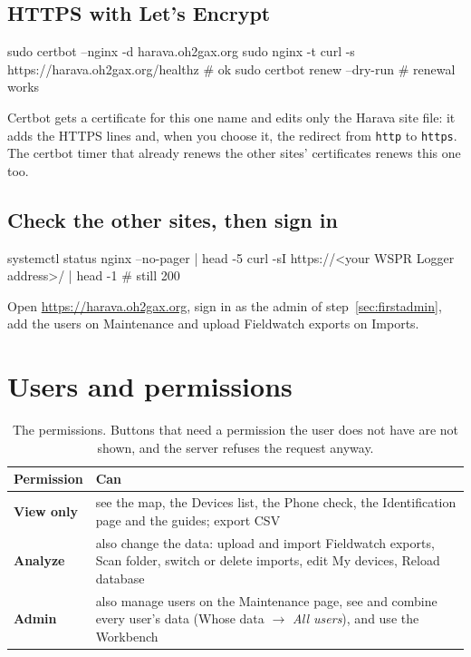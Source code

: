 \documentclass[10pt,a4paper]{article}
\newcommand{\ui}[1]{\textsf{\small #1}}
\begin{document}
\subsection{HTTPS with Let's Encrypt}
\begin{cmd}
sudo certbot --nginx -d harava.oh2gax.org
sudo nginx -t
curl -s https://harava.oh2gax.org/healthz    # ok
sudo certbot renew --dry-run                 # renewal works
\end{cmd}
Certbot gets a certificate for this one name and edits only the Harava site file: it adds the HTTPS lines and, when you choose it, the redirect from \texttt{http} to \texttt{https}. The certbot timer that already renews the other sites' certificates renews this one too.

\subsection{Check the other sites, then sign in}
\begin{cmd}
systemctl status nginx --no-pager | head -5
curl -sI https://<your WSPR Logger address>/ | head -1   # still 200
\end{cmd}
Open \url{https://harava.oh2gax.org}, sign in as the admin of step~\ref{sec:firstadmin}, add the users on \ui{Maintenance} and upload Fieldwatch exports on \ui{Imports}.

\section{Users and permissions}\label{sec:users}

\begin{table}[H]\small\centering
\caption{The permissions. Buttons that need a permission the user does not have are not shown, and the server refuses the request anyway.}
\begin{tabularx}{\textwidth}{>{\bfseries}p{2.2cm}X}
\toprule
Permission & Can\\
\midrule
View only & see the map, the Devices list, the Phone check, the Identification page and the guides; export CSV\\
Analyze & also change the data: upload and import Fieldwatch exports, \ui{Scan folder}, switch or delete imports, edit My devices, \ui{Reload database}\\
Admin & also manage users on the Maintenance page, see and combine every user's data (\ui{Whose data} $\rightarrow$ \emph{All users}), and use the Workbench\\
\bottomrule
\end{tabularx}
\end{table}
\end{document}
